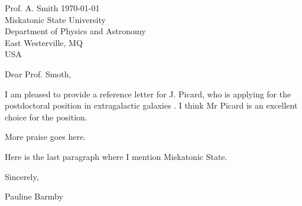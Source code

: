 \documentclass[12pt]{article}
\newcommand{\addressee}{Prof. A. Smith \hfill\today\\}
\newcommand{\retaddress}{Miskatonic State University\\Department of Physics and Astronomy\\East Westerville, MQ\\USA}
\newcommand{\dear}{Dear Prof. Smoth,}
\newcommand{\yourplace}{Miskatonic State}
\newcommand{\posname}{the postdoctoral position in extragalactic galaxies
}
\begin{document}
\thispagestyle{empty}

\vspace*{-1.2in}
\noindent 
\uwoltrhd

\vskip 0.4in

\noindent
\addressee
\retaddress

\vskip 0.2in
\noindent
\dear

\vskip 0.05in

I am pleased to provide a reference letter for J. Picard, who is applying for \posname.
I think Mr Picard is an excellent choice
for the position.

More praise goes here.

Here is the last paragraph where I mention \yourplace.



\vskip0.4in 

\noindent
Sincerely,
\vskip 0.1in
\hskip-0.45in

\noindent
Pauline Barmby
\end{document}
